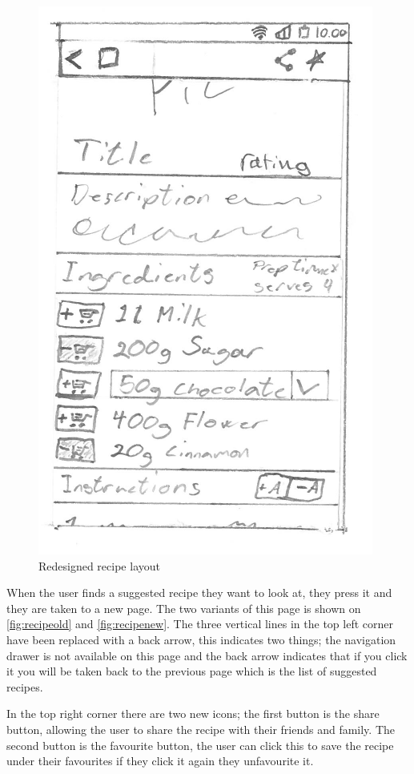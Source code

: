 \begin{figure}[H]
\begin{minipage}[b]{0.5\columnwidth}
\centering
\includegraphics[width=0.735\columnwidth]{img/prototypes/recipe_new.pdf}
\caption{Redesigned recipe layout\label{fig:recipenew}}
\end{minipage}
\end{figure}

When the user finds a suggested recipe they want to look at, they press it and they are taken to a new page. The two variants of this page is shown on \autoref{fig:recipeold} and \autoref{fig:recipenew}. The three vertical lines in the top left corner have been replaced with a back arrow, this indicates two things; the navigation drawer is not available on this page and the back arrow indicates that if you click it you will be taken back to the previous page which is the list of suggested recipes.

In the top right corner there are two new icons; the first button is the share button, allowing the user to share the recipe with their friends and family. The second button is the favourite button, the user can click this to save the recipe under their favourites if they click it again they unfavourite it.

